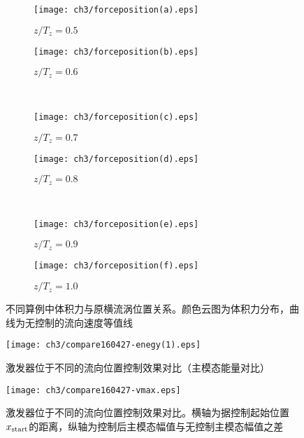 \begin{figure}[H]
    \centering
    \begin{subfigure}{0.45\textwidth}           %
        \texttt{[image: ch3/forceposition(a).eps]}
        \caption{$z/T_z = 0.5$}\label{f:a1}
    \end{subfigure}
    \begin{subfigure}{0.45\textwidth}
        \texttt{[image: ch3/forceposition(b).eps]}
        \caption{$z/T_z = 0.6$}\label{f:b1}
    \end{subfigure}
    \\ \bigskip
    \begin{subfigure}{0.45\textwidth}         %
        \texttt{[image: ch3/forceposition(c).eps]}
        \caption{$z/T_z = 0.7$}\label{f:c1}
    \end{subfigure}
    \begin{subfigure}{0.45\textwidth}          %
        \texttt{[image: ch3/forceposition(d).eps]}
        \caption{$z/T_z = 0.8$}\label{f:d1}
    \end{subfigure}
    \\ \bigskip
    \begin{subfigure}{0.45\textwidth}          %
        \texttt{[image: ch3/forceposition(e).eps]}
        \caption{$z/T_z = 0.9$}\label{f:e1}
    \end{subfigure}
    \begin{subfigure}{0.45\textwidth}          %
        \texttt{[image: ch3/forceposition(f).eps]}
        \caption{$z/T_z = 1.0$}\label{f:f1}
    \end{subfigure}
    \caption{不同算例中体积力与原横流涡位置关系。颜色云图为体积力分布，曲线为无控制的流向速度等值线}
    \label{f:spanwiselocations} %
\end{figure}
\begin{figure}[htb]
  \centering
  \texttt{[image: ch3/compare160427-enegy(1).eps]}\\
  \caption{激发器位于不同的流向位置控制效果对比（主模态能量对比）}\label{f:streamforce}
\end{figure}
\begin{figure}
  \centering
  \texttt{[image: ch3/compare160427-vmax.eps]}\\
  \caption{激发器位于不同的流向位置控制效果对比。横轴为据控制起始位置$x_{\rm start}$的距离，纵轴为控制后主模态幅值与无控制主模态幅值之差}\label{f:streamforce2}
\end{figure}

